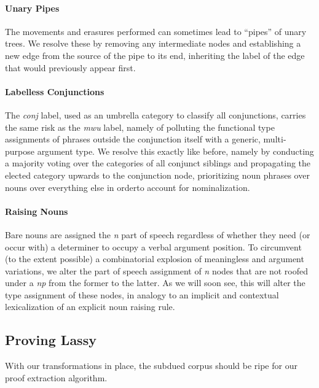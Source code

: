 \paragraph{Unary Pipes}
The movements and erasures performed can sometimes lead to ``pipes'' of unary trees.
We resolve these by removing any intermediate nodes and establishing a new edge from the source of the pipe to its end, inheriting the label of the edge that would previously appear first.

\paragraph{Labelless Conjunctions}
The \textit{conj} label, used as an umbrella category to classify all conjunctions, carries the same risk as the \textit{mwu} label, namely of polluting the functional type assignments of phrases outside the conjunction itself with a generic, multi-purpose argument type.
We resolve this exactly like before, namely by conducting a majority voting over the categories of all conjunct siblings and propagating the elected category upwards to the conjunction node, prioritizing noun phrases over nouns over everything else in orderto account for nominalization.

\paragraph{Raising Nouns}
Bare nouns are assigned the \textit{n} part of speech regardless of whether they need (or occur with) a determiner to occupy a verbal argument position.
To circumvent (to the extent possible) a combinatorial explosion of meaningless  and  argument variations, we alter the part of speech assignment of \textit{n} nodes that are not roofed under a \textit{np} from the former to the latter.
As we will soon see, this will alter the type assignment of these nodes, in analogy to an implicit and contextual lexicalization of an explicit noun raising rule.



\subsection{Proving Lassy}
With our transformations in place, the subdued corpus should be ripe for our proof extraction algorithm.

